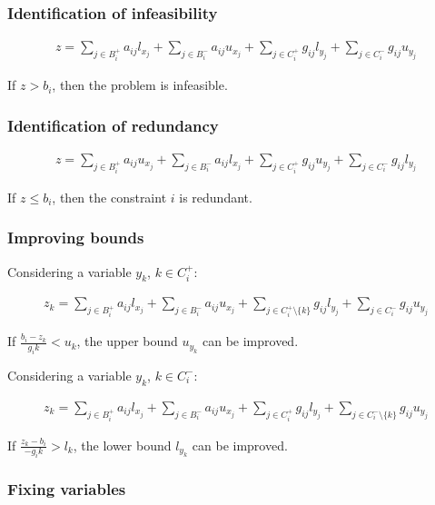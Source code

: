 \documentclass[preprint,12pt]{elsarticle}
\begin{document}
\subsubsection{Identification of infeasibility}

\begin{align}
	z = \sum_{j \in B_i^+}{a_{ij}l_{x_j}} + \sum_{j \in B_i^-}{a_{ij}u_{x_j}} + \sum_{j \in C_i^+}{g_{ij}l_{y_j}} + \sum_{j \in C_i^-}{g_{ij}u_{y_j}}
\end{align}

If $z > b_{i}$, then the problem is infeasible.

\subsubsection{Identification of redundancy}

\begin{align}
	z = \sum_{j \in B_i^+}{a_{ij}u_{x_j}} + \sum_{j \in B_i^-}{a_{ij}l_{x_j}} + \sum_{j \in C_i^+}{g_{ij}u_{y_j}} + \sum_{j \in C_i^-}{g_{ij}l_{y_j}}
\end{align}

If $z \leq b_{i}$, then the constraint $i$ is redundant.

\subsubsection{Improving bounds}

Considering a variable $y_k$, $k \in C_i^{+}$:

\begin{align}
	z_k = \sum_{j \in B_i^+}{a_{ij}l_{x_j}} + \sum_{j \in B_i^-}{a_{ij}u_{x_j}} + \sum_{j \in C_i^+ \setminus\{k\}}{g_{ij}l_{y_j}} + \sum_{j \in C_i^-}{g_{ij}u_{y_j}}
\end{align}

If $\frac{b_i - z_k}{g_ik} < u_k$, the upper bound $u_{y_k}$ can be improved.

Considering a variable $y_k$, $k \in C_i^{-}$:

\begin{align}
	z_k = \sum_{j \in B_i^+}{a_{ij}l_{x_j}} + \sum_{j \in B_i^-}{a_{ij}u_{x_j}} + \sum_{j \in C_i^+}{g_{ij}l_{y_j}} + \sum_{j \in C_i^-\setminus\{k\}}{g_{ij}u_{y_j}}
\end{align}

If $\frac{z_k - b_i}{-g_ik} > l_k$, the lower bound $l_{y_k}$ can be improved.

\subsubsection{Fixing variables}
\end{document}
